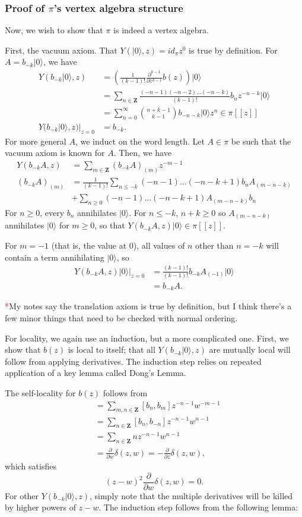 \documentclass{article}
\newcommand{\ZZ}{\mathbold{Z}}
\newcommand{\vac}{|0\rangle}
\newcommand{\tk}{\textcolor{red}{*}}
\begin{document}
\subsubsection{Proof of $\pi$'s vertex algebra structure}
Now, we wish to show that $\pi$ is indeed a vertex algebra.

First, the vacuum axiom.  That $Y(\vac,z)=id_\pi z^0$ is true by definition.  For $A=b_{-k}\vac$, we have
\begin{align}
  Y(b_{-k}\vac,z)&=\left(\frac{1}{(k-1)!} \frac{\partial^{k-1}}{\partial z^{k-1}} b(z) \right) \vac\\
  &=\sum_{n \in \ZZ}\frac{(-n-1)(-n-2)...(-n-k)}{(k-1)!} b_n z^{-n-k} \vac\\
  &=\sum_{n=0}^\infty \binom{n+k-1}{k-1}b_{-n-k}\vac z^n \in \pi[[z]]\\
  Y(b_{-k}\vac,z)|_{z=0}&=b_{-k}.
\end{align}
For more general $A$, we induct on the word length.  Let $A \in \pi$ be such that the vacuum axiom is known for $A$.  Then, we have
\begin{align}
  Y(b_{-k}A,z)&= \sum_{m \in \ZZ}(b_{-k}A)_{(m)}z^{-m-1}\\
  (b_{-k}A)_{(m)}&=\frac{1}{(k-1)!}\sum_{n \le -k}(-n-1)...(-n-k+1)b_nA_{(m-n-k)}\\
  &+\sum_{n \ge 0}(-n-1)...(-n-k+1)A_{(m-n-k)}b_n
\end{align}
For $n \ge 0$, every $b_n$ annihilates $\vac$.  For $n \le -k$, $n+k \ge 0$ so $A_{(m-n-k)}$ annihilates $\vac$ for $m \ge 0$, so that $Y(b_{-k}A,z)\vac \in \pi[[z]]$.

For $m=-1$ (that is, the value at $0$), all values of $n$ other than $n=-k$ will contain a term annihilating $\vac$, so
\begin{align}
  Y(b_{-k}A,z)\vac|_{z=0}&=\frac{(k-1)!}{(k-1)!}b_{-k}A_{(-1)}\vac\\
  &=b_{-k}A.
\end{align}

\tk My notes say the translation axiom is true by definition, but I think there's a few minor things that need to be checked with normal ordering.

For locality, we again use an induction, but a more complicated one.  First, we show that $b(z)$ is local to itself; that all $Y(b_{-k}\vac,z)$ are mutually local will follow from applying derivatives.  The induction step relies on repeated application of a key lemma called Dong's Lemma.

The self-locality for $b(z)$ follows from
\begin{align}
  [b(z),b(w)]&=\sum_{m,n \in \ZZ}[b_n,b_m]z^{-n-1}w^{-m-1}\\
  &=\sum_{n \in \ZZ}[b_n,b_{-n}]z^{-n-1}w^{n-1}\\
  &=\sum_{n \in \ZZ}nz^{-n-1}w^{n-1}\\
  &=\frac{\partial}{\partial w}\delta(z,w)=-\frac{\partial}{\partial z}\delta(z,w),
\end{align}
which satisfies
\[(z-w)^2 \frac{\partial}{\partial w}\delta(z,w)=0.\]  
For other $Y(b_{-k}\vac,z)$, simply note that the multiple derivatives will be killed by higher powers of $z-w$.  The induction step follows from the following lemma:
\end{document}
